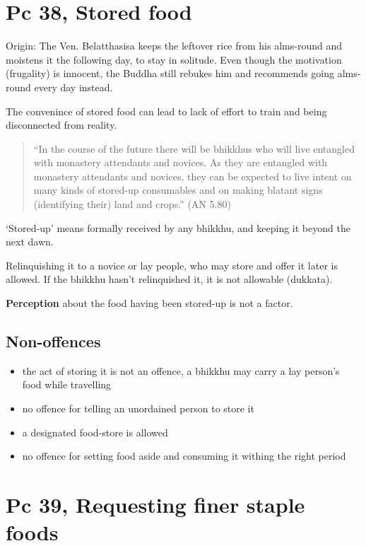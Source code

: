 \section{Pc 38, Stored food}

Origin: The Ven. Belatthasisa keeps the leftover rice from his
alms-round and moistens it the following day, to stay in solitude. Even
though the motivation (frugality) is innocent, the Buddha still rebukes
him and recommends going alms-round every day instead.

The convenince of stored food can lead to lack of effort to train and
being disconnected from reality.

\begin{quote}
``In the course of the future there will be bhikkhus who will live
entangled with monastery attendants and novices. As they are entangled
with monastery attendants and novices, they can be expected to live
intent on many kinds of stored-up consumables and on making blatant
signs (identifying their) land and crops.'' (AN 5.80)
\end{quote}

`Stored-up' means formally received by any bhikkhu, and keeping it
beyond the next dawn.

Relinquishing it to a novice or lay people, who may store and offer it
later is allowed. If the bhikkhu hasn't relinquished it, it is not
allowable (dukkata).

\textbf{Perception} about the food having been stored-up is not a
factor.

\subsection{Non-offences}

\begin{itemize}
\tightlist
\item
  the act of storing it is not an offence, a bhikkhu may carry a lay
  person's food while travelling
\item
  no offence for telling an unordained person to store it
\item
  a designated food-store is allowed
\item
  no offence for setting food aside and consuming it withing the right
  period
\end{itemize}

\clearpage

\section{Pc 39, Requesting finer staple foods}

